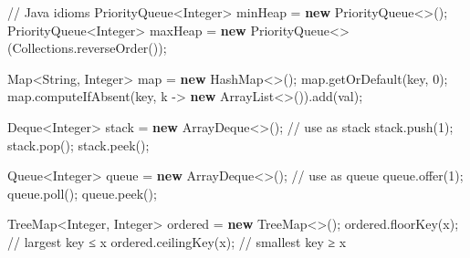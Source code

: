\documentclass[11pt]{article}
\newenvironment{Shaded}{\begin{snugshade}}{\end{snugshade}}
\newcommand{\BuiltInTok}[1]{\textcolor[rgb]{0.50,0.55,0.55}{#1}}
\newcommand{\CommentTok}[1]{\textcolor[rgb]{0.48,0.49,0.49}{#1}}
\newcommand{\DecValTok}[1]{\textcolor[rgb]{0.96,0.45,0.00}{#1}}
\newcommand{\FunctionTok}[1]{\textcolor[rgb]{0.56,0.27,0.68}{#1}}
\newcommand{\KeywordTok}[1]{\textcolor[rgb]{0.81,0.81,0.76}{\textbf{#1}}}
\newcommand{\NormalTok}[1]{\textcolor[rgb]{0.81,0.81,0.76}{#1}}
\newcommand{\OperatorTok}[1]{\textcolor[rgb]{0.81,0.81,0.76}{#1}}
\begin{document}
\begin{Shaded}
\begin{Highlighting}[]
\CommentTok{// Java idioms}
\BuiltInTok{PriorityQueue}\OperatorTok{\textless{}}\BuiltInTok{Integer}\OperatorTok{\textgreater{}}\NormalTok{ minHeap }\OperatorTok{=} \KeywordTok{new} \BuiltInTok{PriorityQueue}\OperatorTok{\textless{}\textgreater{}();}
\BuiltInTok{PriorityQueue}\OperatorTok{\textless{}}\BuiltInTok{Integer}\OperatorTok{\textgreater{}}\NormalTok{ maxHeap }\OperatorTok{=} \KeywordTok{new} \BuiltInTok{PriorityQueue}\OperatorTok{\textless{}\textgreater{}(}\BuiltInTok{Collections}\OperatorTok{.}\FunctionTok{reverseOrder}\OperatorTok{());}

\BuiltInTok{Map}\OperatorTok{\textless{}}\BuiltInTok{String}\OperatorTok{,} \BuiltInTok{Integer}\OperatorTok{\textgreater{}}\NormalTok{ map }\OperatorTok{=} \KeywordTok{new} \BuiltInTok{HashMap}\OperatorTok{\textless{}\textgreater{}();}
\NormalTok{map}\OperatorTok{.}\FunctionTok{getOrDefault}\OperatorTok{(}\NormalTok{key}\OperatorTok{,} \DecValTok{0}\OperatorTok{);}
\NormalTok{map}\OperatorTok{.}\FunctionTok{computeIfAbsent}\OperatorTok{(}\NormalTok{key}\OperatorTok{,}\NormalTok{ k }\OperatorTok{{-}\textgreater{}} \KeywordTok{new} \BuiltInTok{ArrayList}\OperatorTok{\textless{}\textgreater{}()).}\FunctionTok{add}\OperatorTok{(}\NormalTok{val}\OperatorTok{);}

\BuiltInTok{Deque}\OperatorTok{\textless{}}\BuiltInTok{Integer}\OperatorTok{\textgreater{}}\NormalTok{ stack }\OperatorTok{=} \KeywordTok{new} \BuiltInTok{ArrayDeque}\OperatorTok{\textless{}\textgreater{}();}  \CommentTok{// use as stack}
\NormalTok{stack}\OperatorTok{.}\FunctionTok{push}\OperatorTok{(}\DecValTok{1}\OperatorTok{);}\NormalTok{ stack}\OperatorTok{.}\FunctionTok{pop}\OperatorTok{();}\NormalTok{ stack}\OperatorTok{.}\FunctionTok{peek}\OperatorTok{();}

\BuiltInTok{Queue}\OperatorTok{\textless{}}\BuiltInTok{Integer}\OperatorTok{\textgreater{}}\NormalTok{ queue }\OperatorTok{=} \KeywordTok{new} \BuiltInTok{ArrayDeque}\OperatorTok{\textless{}\textgreater{}();}  \CommentTok{// use as queue}
\NormalTok{queue}\OperatorTok{.}\FunctionTok{offer}\OperatorTok{(}\DecValTok{1}\OperatorTok{);}\NormalTok{ queue}\OperatorTok{.}\FunctionTok{poll}\OperatorTok{();}\NormalTok{ queue}\OperatorTok{.}\FunctionTok{peek}\OperatorTok{();}

\BuiltInTok{TreeMap}\OperatorTok{\textless{}}\BuiltInTok{Integer}\OperatorTok{,} \BuiltInTok{Integer}\OperatorTok{\textgreater{}}\NormalTok{ ordered }\OperatorTok{=} \KeywordTok{new} \BuiltInTok{TreeMap}\OperatorTok{\textless{}\textgreater{}();}
\NormalTok{ordered}\OperatorTok{.}\FunctionTok{floorKey}\OperatorTok{(}\NormalTok{x}\OperatorTok{);}    \CommentTok{// largest key ≤ x}
\NormalTok{ordered}\OperatorTok{.}\FunctionTok{ceilingKey}\OperatorTok{(}\NormalTok{x}\OperatorTok{);}  \CommentTok{// smallest key ≥ x}
\end{Highlighting}
\end{Shaded}
\end{document}
